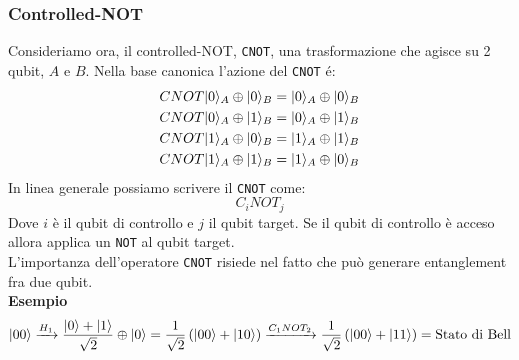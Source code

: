 \documentclass[12pt, a4paper]{report}
\begin{document}
\subsubsection{Controlled-NOT}
Consideriamo ora, il controlled-NOT, \texttt{CNOT}, una trasformazione che agisce su 2 qubit, $A$ e $B$. Nella base canonica l'azione del \texttt{CNOT} é:
\begin{equation*}
    \begin{split}
        CNOT | 0 \rangle_{A}\oplus | 0 \rangle_{B} &= | 0 \rangle_{A}\oplus | 0 \rangle_{B} \\
        CNOT | 0 \rangle_{A}\oplus | 1 \rangle_{B} &= | 0 \rangle_{A}\oplus | 1 \rangle_{B} \\
        CNOT | 1 \rangle_{A}\oplus | 0 \rangle_{B} &= | 1 \rangle_{A}\oplus | 1 \rangle_{B} \\
        CNOT | 1 \rangle_{A}\oplus | 1 \rangle_{B} &= | 1 \rangle_{A}\oplus | 0 \rangle_{B} 
    \end{split}
\end{equation*}
In linea generale possiamo scrivere il \texttt{CNOT} come:
\begin{equation*}
    C_{i}NOT_{j}
\end{equation*}
Dove $i$ è il qubit di controllo e $j$ il qubit target. Se il qubit di controllo è acceso allora applica un \texttt{NOT} al qubit target.\\
L'importanza dell'operatore \texttt{CNOT} risiede nel fatto che può generare entanglement fra due qubit.\\
\textbf{Esempio}
\begin{equation*}
    | 00 \rangle \xrightarrow{H_{1}} \frac{| 0 \rangle+| 1 \rangle}{\sqrt{2}} \oplus | 0 \rangle = \frac{1}{\sqrt{2}}\left(| 00 \rangle+| 10 \rangle\right) \xrightarrow{C_{1}NOT_{2}} \frac{1}{\sqrt{2}}\left(| 00 \rangle+| 11 \rangle\right) = \text{Stato di Bell}
\end{equation*}
\end{document}

